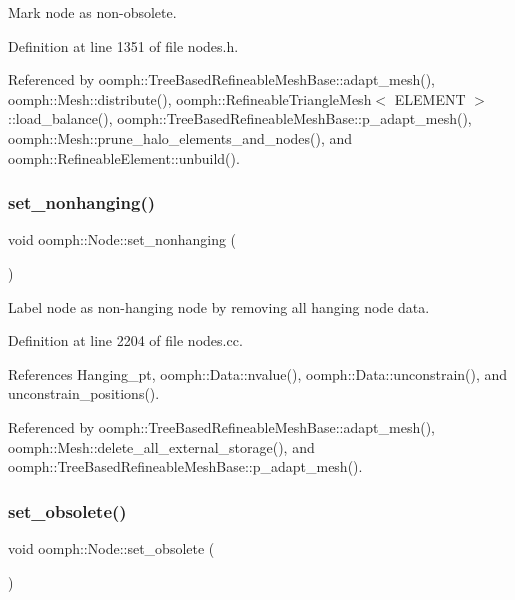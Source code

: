 Mark node as non-\/obsolete. 



Definition at line 1351 of file nodes.\+h.



Referenced by oomph\+::\+Tree\+Based\+Refineable\+Mesh\+Base\+::adapt\+\_\+mesh(), oomph\+::\+Mesh\+::distribute(), oomph\+::\+Refineable\+Triangle\+Mesh$<$ E\+L\+E\+M\+E\+N\+T $>$\+::load\+\_\+balance(), oomph\+::\+Tree\+Based\+Refineable\+Mesh\+Base\+::p\+\_\+adapt\+\_\+mesh(), oomph\+::\+Mesh\+::prune\+\_\+halo\+\_\+elements\+\_\+and\+\_\+nodes(), and oomph\+::\+Refineable\+Element\+::unbuild().

\mbox{\label{classoomph_1_1Node_a2517b670b4494f5421f5ec0d92cf8bb0}} 
\subsubsection{\texorpdfstring{set\+\_\+nonhanging()}{set\_nonhanging()}}
{\footnotesize\ttfamily void oomph\+::\+Node\+::set\+\_\+nonhanging (\begin{DoxyParamCaption}{ }\end{DoxyParamCaption})}



Label node as non-\/hanging node by removing all hanging node data. 



Definition at line 2204 of file nodes.\+cc.



References Hanging\+\_\+pt, oomph\+::\+Data\+::nvalue(), oomph\+::\+Data\+::unconstrain(), and unconstrain\+\_\+positions().



Referenced by oomph\+::\+Tree\+Based\+Refineable\+Mesh\+Base\+::adapt\+\_\+mesh(), oomph\+::\+Mesh\+::delete\+\_\+all\+\_\+external\+\_\+storage(), and oomph\+::\+Tree\+Based\+Refineable\+Mesh\+Base\+::p\+\_\+adapt\+\_\+mesh().

\mbox{\label{classoomph_1_1Node_a2f19488a7967f963b073b93dc12728ab}} 
\subsubsection{\texorpdfstring{set\+\_\+obsolete()}{set\_obsolete()}}
{\footnotesize\ttfamily void oomph\+::\+Node\+::set\+\_\+obsolete (\begin{DoxyParamCaption}{ }\end{DoxyParamCaption})\hspace{0.3cm}{\ttfamily [inline]}}




